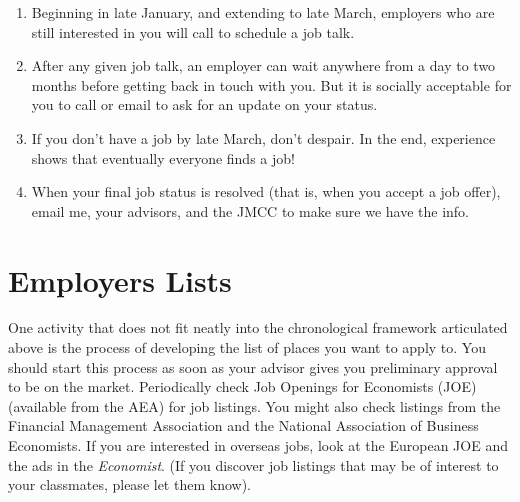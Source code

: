 \documentclass{\classes/econtex}
\begin{document}
\begin{enumerate}
  \hypertarget{Job-Talks-Scheduled}{}
\item Beginning in late January, and extending to late March,
  employers who are still interested in you will call to schedule a
  job talk.

  \hypertarget{How-Long-Will-It-Be}{}
\item After any given job talk, an employer can wait anywhere from a
  day to two months before getting back in touch with you.  But it is
  socially acceptable for you to call or email to ask for an update on
  your status.
  
  \hypertarget{Dont-Despair}{}
\item If you don't have a job by late March, don't despair.  In the
  end, experience shows that eventually everyone finds a job!

  \hypertarget{Report-Outcome}{}
\item When your final job status is resolved (that is, when you accept 
  a job offer), email me, your advisors, and the JMCC to make sure we have the info.

\end{enumerate}

\section{Employers Lists}\hypertarget{below}{}
One activity that does not fit neatly into the chronological framework
articulated above is the process of developing the list of places you
want to apply to.  You should start this process as soon as your
advisor gives you preliminary approval to be on the market.
Periodically check Job Openings for Economists (JOE) (available from
the AEA) for job listings.  You might also check listings from the
Financial Management Association and the National Association of
Business Economists.  If you are interested in overseas jobs, look at
the European JOE and the ads in the \textit{Economist}.  (If you discover
job listings that may be of interest to your classmates, please let
them know).
\end{document}
